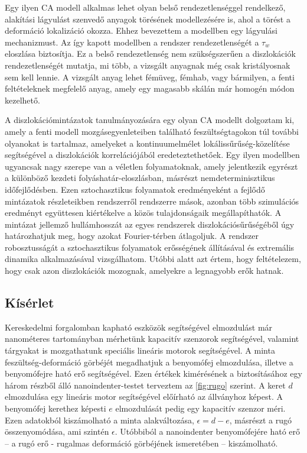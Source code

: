 Egy ilyen CA modell alkalmas lehet olyan belső rendezetlenséggel rendelkező, alakítási lágyulást szenvedő anyagok törésének modellezésére is, ahol a törést a deformáció lokalizáció okozza. Ehhez bevezettem a modellben egy lágyulási mechanizmust. Az így kapott modellben a rendszer rendezetlenségét a $\tau_w$ eloszlása biztosítja. Ez a belső rendezetlenség nem szükségszerűen a diszlokációk rendezetlenségét mutatja, mi több, a vizsgált anyagnak még csak kristályosnak sem kell lennie. A vizsgált anyag lehet fémüveg, fémhab, vagy bármilyen, a fenti feltételeknek megfelelő anyag, amely egy magasabb skálán már homogén módon kezelhető.

A diszlokációmintázatok tanulmányozására egy olyan CA modellt dolgoztam ki, amely a fenti modell mozgásegyenleteiben található feszültségtagokon túl további olyanokat is tartalmaz, amelyeket a kontinuumelmélet lokálissűrűség-közelítése segítségével a diszlokációk korrelációjából eredeteztethetőek. Egy ilyen modellben ugyancsak nagy szerepe van a véletlen folyamatoknak, amely jelentkezik egyrészt a különböző kezdeti folyáshatár-eloszlásban, másrészt nemdeterminisztikus időfejlődésben. Ezen sztochasztikus folyamatok eredményeként a fejlődő mintázatok részleteikben rendszerről rendszerre mások, azonban több szimulációs eredményt együttesen kiértékelve a közös tulajdonságaik megállapíthatók. A mintázat jellemző hullámhosszát az egyes rendszerek diszlokációsűrűségéből úgy határozhatjuk meg, hogy azokat Fourier-térben átlagoljuk. A rendszer robosztusságát a sztochasztikus folyamatok erősségének állításával és extremális dinamika alkalmazásával vizsgálhatom. Utóbbi alatt azt értem, hogy feltételezem, hogy csak azon diszlokációk mozognak, amelyekre a legnagyobb erők hatnak.

\subsection*{Kísérlet}
Kereskedelmi forgalomban kapható eszközök segítségével elmozdulást már nanométeres tartományban mérhetünk kapacitív szenzorok segítségével, valamint tárgyakat is mozgathatunk speciális lineáris motorok segítségével. A minta feszültség-deformáció görbéjét megadhatjuk a benyomófej elmozdulása, illetve a benyomófejre ható erő segítségével. Ezen értékek kimérésének a biztosításához egy három részből álló nanoindenter-testet terveztem az \ref{fig:rugo} szerint. A keret $d$ elmozdulása egy lineáris motor segítségével előírható az állványhoz képest. A benyomófej kerethez képesti $e$ elmozdulását pedig egy kapacitív szenzor méri. Ezen adatokból kiszámolható a minta alakváltozása, $\epsilon = d - e $, másrészt a rugó összenyomódása, ami szintén $\epsilon$. Utóbbiból a nanoindenter benyomófejére ható erő -- a rugó erő - rugalmas deformáció görbéjének ismeretében -- kiszámolható.

